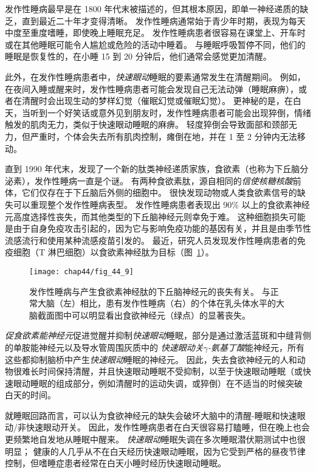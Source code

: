 发作性睡病最早是在 1800 年代末被描述的，但其根本原因，即单一神经递质的缺乏，直到最近二十年才变得清晰。
发作性睡病通常始于青少年时期，表现为每天中度至重度嗜睡，即使晚上睡眠充足。
发作性睡病患者很容易在课堂上、开车时或在其他睡眠可能令人尴尬或危险的活动中睡着。
与睡眠呼吸暂停不同，他们的睡眠是恢复性的，在小睡 15 到 20 分钟后，他们通常会感觉更加清醒。


此外，在发作性睡病患者中，\textit{快速眼动}睡眠的要素通常发生在清醒期间。
例如，在夜间入睡或醒来时，发作性睡病患者可能会发现自己无法动弹（睡眠麻痹），或者在清醒时会出现生动的梦样幻觉（催眠幻觉或催眠幻觉）。
更神秘的是，在白天，当听到一个好笑话或意外见到朋友时，发作性睡病患者可能会出现猝倒，情绪触发的肌肉无力，类似于快速眼动睡眠的麻痹。
轻度猝倒会导致面部和颈部无力，但严重时，个体会失去所有肌肉控制，瘫倒在地，并在 1 至 2 分钟内无法移动。


直到 1990 年代末，发现了一个新的肽类神经递质家族，食欲素（也称为下丘脑分泌素），发作性睡病一直是个谜。
有两种食欲素肽，源自相同的\textit{信使核糖核酸}前体，它们仅存在于下丘脑后外侧的细胞中。
很快发现动物或人类食欲素信号的缺失可以重现整个发作性睡病表型。
发作性睡病患者表现出 90\% 以上的食欲素神经元高度选择性丧失，而其他类型的下丘脑神经元则幸免于难。
这种细胞损失可能是由于自身免疫攻击引起的，因为它与影响免疫功能的基因有关，并且是由季节性流感流行和使用某种流感疫苗引发的。
最近，研究人员发现发作性睡病患者的免疫细胞（T 淋巴细胞）以食欲素神经肽为目标（图~\ref{fig:44_9}）。


\begin{figure}[htbp]
	\centering
	\texttt{[image: chap44/fig\_44\_9]}
	\caption{发作性睡病与产生食欲素神经肽的下丘脑神经元的丧失有关。
		与正常大脑（左）相比，患有发作性睡病（右）的个体在乳头体水平的大脑截面图中可以明显看出食欲神经元（绿点）的显著丧失\cite{crocker2005concomitant}。}
	\label{fig:44_9}
\end{figure}


\textit{促食欲素能神经元}促进觉醒并抑制\textit{快速眼动}睡眠，部分是通过激活蓝斑和中缝背侧的单胺能神经元以及导水管周围灰质中的 \textit{快速眼动关}\textit{$\gamma$-氨基丁酸}能神经元，所有这些都抑制脑桥中产生\textit{快速眼动}睡眠的神经元。
因此，失去食欲神经元的人和动物很难长时间保持清醒，并且快速眼动睡眠不受抑制，以至于快速眼动睡眠（或快速眼动睡眠的组成部分，例如清醒时的运动失调，或猝倒）在不适当的时候突破 白天的时间。


就睡眠回路而言，可以认为食欲神经元的缺失会破坏大脑中的清醒-睡眠和快速眼动/非快速眼动开关。
因此，发作性睡病患者在白天很容易打瞌睡，但在晚上也会更频繁地自发地从睡眠中醒来。
\textit{快速眼动}睡眠失调在多次睡眠潜伏期测试中也很明显；
健康的人几乎从不在白天经历快速眼动睡眠，因为它受到严格的昼夜节律控制，但嗜睡症患者经常在白天小睡时经历快速眼动睡眠。


